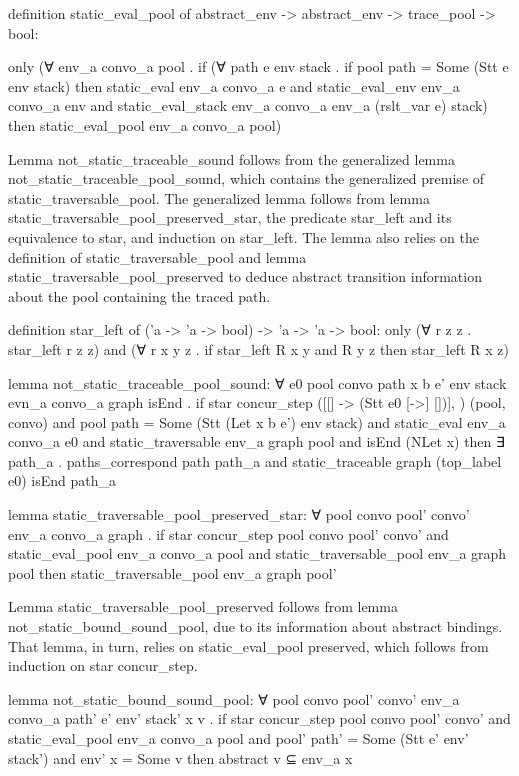 \documentclass{article}
\begin{document}
definition static_eval_pool of abstract_env -> abstract_env -> trace_pool -> bool:

only
(∀ env_a convo_a pool .
  if
    (∀ path e env stack . if pool path = Some (Stt e env stack) then 
      static_eval env_a convo_a e and
      static_eval_env env_a convo_a env and
      static_eval_stack env_a convo_a env_a (rslt_var e) stack)
  then 
    static_eval_pool env_a convo_a pool)

Lemma not_static_traceable_sound follows from the generalized lemma
not_static_traceable_pool_sound, which contains the generalized premise of
static_traversable_pool. The generalized lemma follows from lemma
static_traversable_pool_preserved_star, the predicate star_left and its equivalence to star,
and induction on star_left. The lemma also relies on the definition of static_traversable_pool
and lemma static_traversable_pool_preserved to deduce abstract transition information about the
pool containing the traced path.

definition star_left of ('a -> 'a -> bool) -> 'a -> 'a -> bool:
only
(∀ r z z . star_left r z z) and
(∀ r x y z .
  if
    star_left R x y and R y z
  then
    star_left R x z)


lemma not_static_traceable_pool_sound:
∀ e0 pool convo path x b e' env stack evn_a convo_a graph isEnd .
  if
    star concur_step ([[] -> (Stt e0 [->] [])], {}) (pool, convo) and 
    pool path = Some (Stt (Let x b e') env stack) and 
    static_eval env_a convo_a e0 and 
    static_traversable env_a graph pool and 
    isEnd (NLet x)
  then
    ∃ path_a . 
      paths_correspond path path_a and 
      static_traceable graph (top_label e0) isEnd path_a

lemma static_traversable_pool_preserved_star:
∀  pool convo pool' convo' env_a convo_a graph .
  if
    star concur_step pool convo pool' convo' and 
    static_eval_pool env_a convo_a pool and
    static_traversable_pool env_a graph pool
  then
    static_traversable_pool env_a graph pool' 


Lemma static_traversable_pool_preserved follows from lemma not_static_bound_sound_pool, due to
its information about abstract bindings.  That lemma, in turn, relies on static_eval_pool
preserved, which follows from induction on star concur_step.

lemma not_static_bound_sound_pool:
∀ pool convo pool' convo' env_a convo_a path' e' env' stack' x v .
  if
    star concur_step pool convo pool' convo' and 
    static_eval_pool env_a convo_a pool and 
    pool' path' = Some (Stt e' env' stack') and 
    env' x = Some v 
  then
    {abstract v} ⊆ env_a x
\end{document}

